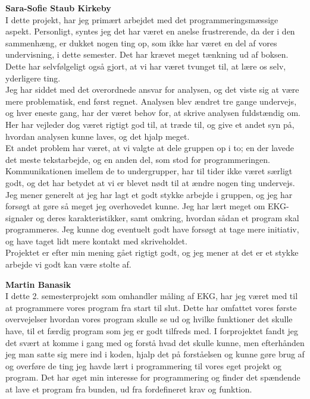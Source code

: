 \textbf{Sara-Sofie Staub Kirkeby}\\
I dette projekt, har jeg primært arbejdet med det programmeringsmæssige aspekt. Personligt, syntes jeg det har været en anelse frustrerende, da der i den sammenhæng, er dukket nogen ting op, som ikke har været en del af vores undervisning, i dette semester. Det har krævet meget tænkning ud af boksen. Dette har selvfølgeligt også gjort, at vi har været tvunget til, at lære os selv, yderligere ting. \\
Jeg har siddet med det overordnede ansvar for analysen, og det viste sig at være mere problematisk, end først regnet. Analysen blev ændret tre gange undervejs, og hver eneste gang, har der været behov for, at skrive analysen fuldstændig om. Her har vejleder dog været rigtigt god til, at træde til, og give et andet syn på, hvordan analysen kunne laves, og det hjalp meget.\\ 
Et andet problem har været, at vi valgte at dele gruppen op i to; en der lavede det meste tekstarbejde, og en anden del, som stod for programmeringen. Kommunikationen imellem de to undergrupper, har til tider ikke været særligt godt, og det har betydet at vi er blevet nødt til at ændre nogen ting undervejs. \\
Jeg mener generelt at jeg har lagt et godt stykke arbejde i gruppen, og jeg har forsøgt at gøre så meget jeg overhovedet kunne. Jeg har lært meget om EKG-signaler og deres karakteristikker, samt omkring, hvordan sådan et program skal programmeres. Jeg kunne dog eventuelt godt have forsøgt at tage mere initiativ, og have taget lidt mere kontakt med skriveholdet. \\
Projektet er efter min mening gået rigtigt godt, og jeg mener at det er et stykke arbejde vi godt kan være stolte af.

\textbf{Martin Banasik}\\
I dette 2. semesterprojekt som omhandler måling af EKG, har jeg været med til at programmere vores program fra start til slut. Dette har omfattet vores første overvejelser hvordan vores program skulle se ud og hvilke funktioner det skulle have, til et færdig program som jeg er godt tilfreds med. I forprojektet fandt jeg det svært at komme i gang med og forstå hvad det skulle kunne, men efterhånden jeg man satte sig mere ind i koden, hjalp det på forståelsen og kunne gøre brug af og overføre de ting jeg havde lært i programmering til vores eget projekt og program. Det har øget min interesse for programmering og finder det spændende at lave et program fra bunden, ud fra fordefineret krav og funktion. 

